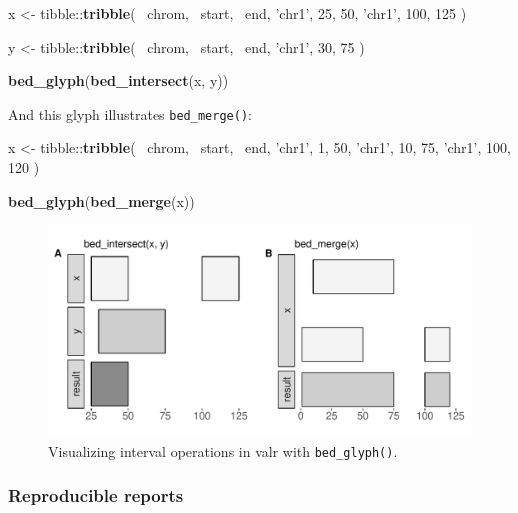 \documentclass[9pt,a4paper]{extarticle}
\renewcommand{\KeywordTok}[1]{\textbf{{#1}}}
\renewcommand{\DecValTok}[1]{\textcolor[rgb]{0.00,0.00,1.00}{{#1}}}
\renewcommand{\StringTok}[1]{\textcolor[rgb]{0.87,0.00,0.00}{{#1}}}
\renewcommand{\NormalTok}[1]{{#1}}
\begin{document}
\begin{Highlighting}[]
\NormalTok{x <-}\StringTok{ }\NormalTok{tibble::}\KeywordTok{tribble}\NormalTok{(}
  \NormalTok{~chrom, ~start, ~end,}
  \StringTok{'chr1'}\NormalTok{, }\DecValTok{25}\NormalTok{,     }\DecValTok{50}\NormalTok{,}
  \StringTok{'chr1'}\NormalTok{, }\DecValTok{100}\NormalTok{,    }\DecValTok{125}
\NormalTok{)}

\NormalTok{y <-}\StringTok{ }\NormalTok{tibble::}\KeywordTok{tribble}\NormalTok{(}
  \NormalTok{~chrom, ~start, ~end,}
  \StringTok{'chr1'}\NormalTok{, }\DecValTok{30}\NormalTok{,     }\DecValTok{75}
\NormalTok{)}

\KeywordTok{bed_glyph}\NormalTok{(}\KeywordTok{bed_intersect}\NormalTok{(x, y))}
\end{Highlighting}

And this glyph illustrates \texttt{bed\_merge()}:

\begin{Highlighting}[]
\NormalTok{x <-}\StringTok{ }\NormalTok{tibble::}\KeywordTok{tribble}\NormalTok{(}
  \NormalTok{~chrom, ~start, ~end,}
  \StringTok{'chr1'}\NormalTok{,      }\DecValTok{1}\NormalTok{,      }\DecValTok{50}\NormalTok{,}
  \StringTok{'chr1'}\NormalTok{,      }\DecValTok{10}\NormalTok{,     }\DecValTok{75}\NormalTok{,}
  \StringTok{'chr1'}\NormalTok{,      }\DecValTok{100}\NormalTok{,    }\DecValTok{120}
\NormalTok{)}

\KeywordTok{bed_glyph}\NormalTok{(}\KeywordTok{bed_merge}\NormalTok{(x))}
\end{Highlighting}

\begin{figure}[!htb]
\centering
\includegraphics[width=\textwidth]{glyphs.pdf}
\caption{\label{fig:Figure 1}Visualizing interval operations in valr with \texttt{bed\_glyph()}.} 
\end{figure}

\subsubsection{Reproducible reports}\label{reproducible-reports}
\end{document}
